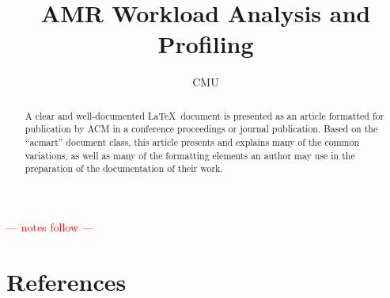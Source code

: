 \documentclass[sigconf,authordraft,natbib=false]{acm-template/acmart}
\newcommand{\red}[1]{\textcolor{red}{#1}}
\begin{document}
\title{AMR Workload Analysis and Profiling}

\author{CMU}

\begin{abstract}
  A clear and well-documented \LaTeX\ document is presented as an
  article formatted for publication by ACM in a conference proceedings
  or journal publication. Based on the ``acmart'' document class, this
  article presents and explains many of the common variations, as well
  as many of the formatting elements an author may use in the
  preparation of the documentation of their work.
\end{abstract}



\maketitle








\red{ --- notes follow --- }

\section{References}

\printbibliography
\end{document}
